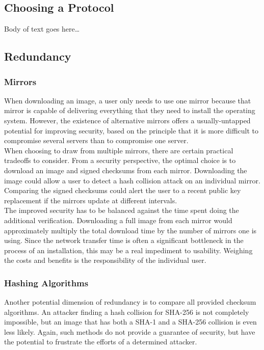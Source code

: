 \documentclass[conference]{IEEEtran}
\begin{document}
\subsection{Choosing a Protocol}

Body of text goes here\ldots

\subsection{Redundancy\label{redundancy}}

\subsubsection{Mirrors}

When downloading an image, a user only needs to use one mirror because that mirror is
capable of delivering everything that they need to install the operating system. However,
the existence of alternative mirrors offers a usually-untapped potential for improving
security, based on the principle that it is more difficult to compromise several servers
than to compromise one server.\\
\indent When choosing to draw from multiple mirrors, there are
certain practical tradeoffs to consider. From a security perspective, the optimal choice
is to download an image and signed checksums from each mirror. Downloading
the image could allow a user to detect a hash collision attack on an individual mirror.
Comparing the signed checksums could alert the user to a recent public key replacement if
the mirrors update at different intervals.\\
\indent The improved security has to be balanced against the time spent doing the additional
verification. Downloading a full image from each mirror would approximately multiply the
total download time by the number of mirrors one is using. Since the network transfer time
is often a significant bottleneck in the process of an installation, this may be a real
impediment to usability. Weighing the costs and benefits is the responsibility of the
individual user.

\subsubsection{Hashing Algorithms}
Another potential dimension of redundancy is to compare all provided checksum algorithms.
An attacker finding a hash collision for SHA-256 is not completely impossible, but an image
that has both a SHA-1 and a SHA-256 collision is even less likely. Again, such methods
do not provide a guarantee of security, but have the potential to frustrate the efforts of
a determined attacker.
\end{document}
